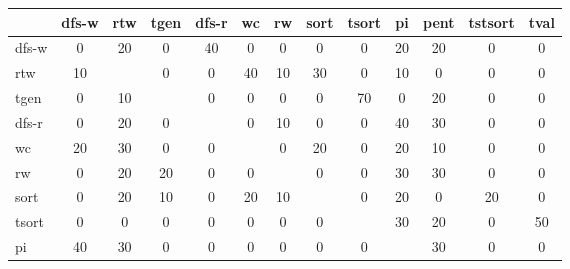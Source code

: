 %    
\begin{table}
    \begin{tabular}{|l|c|c|c|c|c|c|c|c|c|c|c|c|}
    	\hline
    	              & \acs{dfs-w} & \acs{rtw} & \acs{tgen} & \acs{dfs-r} & \acs{wc} & \acs{rw} & \acs{sort} & \acs{tsort} & \acs{pi} & \acs{pent} & \acs{tstsort} & \acs{tval} \\ \hline
    	\acs{dfs-w}   &      0      &    20     &     0      &     40      &    0     &    0     &     0      &      0      &    20    &     20     &       0       &     0      \\ \hline
    	\acs{rtw}     &     10      &           &     0      &      0      &    40    &    10    &     30     &      0      &    10    &     0      &       0       &     0      \\ \hline
    	\acs{tgen}    &      0      &    10     &            &      0      &    0     &    0     &     0      &     70      &    0     &     20     &       0       &     0      \\ \hline
    	\acs{dfs-r}   &      0      &    20     &     0      &             &    0     &    10    &     0      &      0      &    40    &     30     &       0       &     0      \\ \hline
    	\acs{wc}      &     20      &    30     &     0      &      0      &          &    0     &     20     &      0      &    20    &     10     &       0       &     0      \\ \hline
    	\acs{rw}      &      0      &    20     &     20     &      0      &    0     &          &     0      &      0      &    30    &     30     &       0       &     0      \\ \hline
    	\acs{sort}    &      0      &    20     &     10     &      0      &    20    &    10    &            &      0      &    20    &     0      &      20       &     0      \\ \hline
    	\acs{tsort}   &      0      &     0     &     0      &      0      &    0     &    0     &     0      &             &    30    &     20     &       0       &     50     \\ \hline
    	\acs{pi}      &     40      &    30     &     0      &      0      &    0     &    0     &     0      &      0      &          &     30     &       0       &     0      \\ \hline

\end{tabular}
\end{table}
